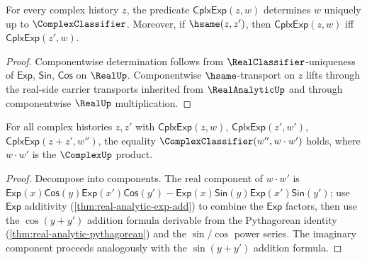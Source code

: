 \begin{lemma}
\label{lem:cplx-exp-well-defined}
For every complex history \(z\), the predicate \(\mathsf{CplxExp}(z, w)\) determines \(w\) uniquely up to \(\ComplexClassifier\). Moreover, if \(\hsame(z, z')\), then \(\mathsf{CplxExp}(z, w)\) iff \(\mathsf{CplxExp}(z', w)\).
\end{lemma}
\begin{proof}
Componentwise determination follows from \(\RealClassifier\)-uniqueness of \(\mathsf{Exp}\), \(\mathsf{Sin}\), \(\mathsf{Cos}\) on \(\RealUp\). Componentwise \(\hsame\)-transport on \(z\) lifts through the real-side carrier transports inherited from \(\RealAnalyticUp\) and through componentwise \(\RealUp\) multiplication.
\end{proof}

\begin{theorem}
\label{thm:cplx-exp-add}
For all complex histories \(z, z'\) with \(\mathsf{CplxExp}(z, w)\), \(\mathsf{CplxExp}(z', w')\), \(\mathsf{CplxExp}(z + z', w'')\), the equality \(\ComplexClassifier(w'', w \cdot w')\) holds, where \(w \cdot w'\) is the \(\ComplexUp\) product.
\end{theorem}
\begin{proof}
Decompose into components. The real component of \(w \cdot w'\) is \(\mathsf{Exp}(x) \mathsf{Cos}(y) \mathsf{Exp}(x') \mathsf{Cos}(y') - \mathsf{Exp}(x) \mathsf{Sin}(y) \mathsf{Exp}(x') \mathsf{Sin}(y')\); use \(\mathsf{Exp}\) additivity (\autoref{thm:real-analytic-exp-add}) to combine the \(\mathsf{Exp}\) factors, then use the \(\cos(y+y')\) addition formula derivable from the Pythagorean identity (\autoref{thm:real-analytic-pythagorean}) and the \(\sin / \cos\) power series. The imaginary component proceeds analogously with the \(\sin(y + y')\) addition formula.
\end{proof}

